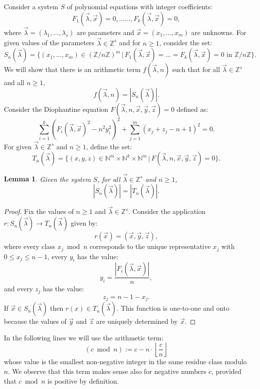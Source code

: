 \documentclass[10pt,a4paper]{article}
\theoremstyle{plain}
\newtheorem{lemma}{Lemma}[section]
\begin{document}
Consider a system $S$ of polynomial equations with integer coefficients:
$$
    F_1(\vec \lambda, \vec x) = 0,
     \ldots\ldots, 
    F_k(\vec \lambda, \vec x) = 0,
$$
where $\vec \lambda = (\lambda_1, \dots, \lambda_s)$ are parameters and $\vec x = (x_1, \dots, x_m)$ are unknowns. For given values of the parameters $\vec \lambda \in \mathbb Z^s$ and for $n \geq 1$, consider the set:
$$S_n(\vec \lambda) = \{(x_1, \dots, x_m) \in (\mathbb Z / n \mathbb Z)^m \,|\, F_1(\vec \lambda, \vec x) = \dots = F_k(\vec \lambda, \vec x) = 0 \textrm{ in $\mathbb Z/ n\mathbb Z$} \}. $$ 
We will show that there is an arithmetic term $f(\vec \lambda , n)$ such that for all $\vec \lambda \in \mathbb Z^s$ and all $n \geq 1$,
$$f(\vec \lambda, n) = |S_n(\vec \lambda)|. $$ 
Consider the Diophantine equation $F(\vec \lambda, n, \vec x, \vec y, \vec z) = 0$ defined as:
$$\sum _{i = 1}^k {\left ( {F_i(\vec \lambda, \vec x)}^2 - n^2 y_i^2 \right )}^2 + \sum _{j = 1}^m {(x_j + z_j - n + 1)}^2 = 0.$$
For given  $\vec \lambda \in \mathbb Z ^s$ and $n \geq 1$, define the set:
$$T_n(\vec \lambda) = \{(x, y, z) \in \mathbb{N}^{m} \times \mathbb{N}^{k} \times \mathbb{N}^{m} \,|\, F(\vec \lambda, n, \vec x, \vec y, \vec z) = 0 \}. $$ 
\begin{lemma}\label{first}
    Given the system $S$, for all $\vec \lambda \in \mathbb Z ^s$ and $n \geq 1$, 
    $$|S_n(\vec \lambda)| = |T_n(\vec \lambda)| .$$
\end{lemma}

\begin{proof} Fix the values of $n \geq 1$ and $\vec \lambda \in \mathbb Z^s$. Consider the application $r : S_n(\vec \lambda) \rightarrow T_n(\vec \lambda)$ given by:
$$r(\vec x) = (\vec x, \vec y, \vec z),$$
where every class $x_j \bmod n$ corresponds to the unique representative $x_j$ with $0 \leq x_j \leq n-1$, every $y_i$ has the value:
$$y_i = \frac{|F_i (\vec \lambda, \vec x)|}{n},$$
and every $z_j$ has the value:
$$z_j = n - 1 - x_j.$$
If $\vec x \in S_n(\vec \lambda)$ then $r(x) \in T_n(\vec \lambda)$. This function is one-to-one and onto because the values of $\vec y$ and $\vec z$ are uniquely determined by $\vec x$. 
\end{proof}

In the following lines we will use the arithmetic term:
$$ (c \bmod n) := c - n \cdot \left \lfloor \frac{c}{n} \right \rfloor $$
whose value is the smallest non-negative integer in the same residue class modulo $n$. We observe that this term makes sense also for negative numbers $c$, provided that  $c \bmod n$ is positive by definition. 
\end{document}
